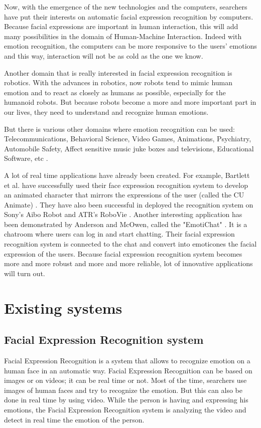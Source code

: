 Now, with the emergence of the new technologies and the computers, searchers have put their interests on automatic facial expression recognition by computers. Because facial expressions are important in human interaction, this will add many possibilities in the domain of Human-Machine Interaction. Indeed with emotion recognition, the computers can be more responsive to the users' emotions and this way, interaction will not be as cold as the one we know. 

Another domain that is really interested in facial expression recognition is robotics. With the advances in robotics, now robots tend to mimic human emotion and to react as closely as humans as possible, especially for the humanoid robots. But because robots become a more and more important part in our lives, they need to understand and recognize human emotions.

But there is various other domains where emotion recognition can be used: Telecommunications, Behavioral Science, Video Games, Animations, Psychiatry, Automobile Safety, Affect sensitive music juke boxes and televisions, Educational Software, etc \cite{BET12}.

A lot of real time applications have already been created. For example, Bartlett et al. have successfully used their face expression recognition system to develop an animated character that mirrors the expressions of the user (called the CU Animate) \cite{BAR03}. They have also been successful in deployed the recognition system on Sony's Aibo Robot and ATR's RoboVie \cite{BAR03}. Another interesting application has been demonstrated by Anderson and McOwen, called the "EmotiChat" \cite{AND06}. It is a chatroom where users can log in and start chatting. Their facial expression recognition system is connected to the chat and convert into emoticones the facial expression of the users. Because facial expression recognition system becomes more and more robust and more and more reliable, lot of innovative applications will turn out.

\chapter{Existing systems}

\section{Facial Expression Recognition system}

Facial Expression Recognition is a system that allows to recognize emotion on a human face in an automatic way. Facial Expression Recognition can be based on images or on videos; it can be real time or not. Most of the time, searchers use images of human faces and try to recognize the emotion. But this can also be done in real time by using video. While the person is having and expressing his emotions, the Facial Expression Recognition system is analyzing the video and detect in real time the emotion of the person.

